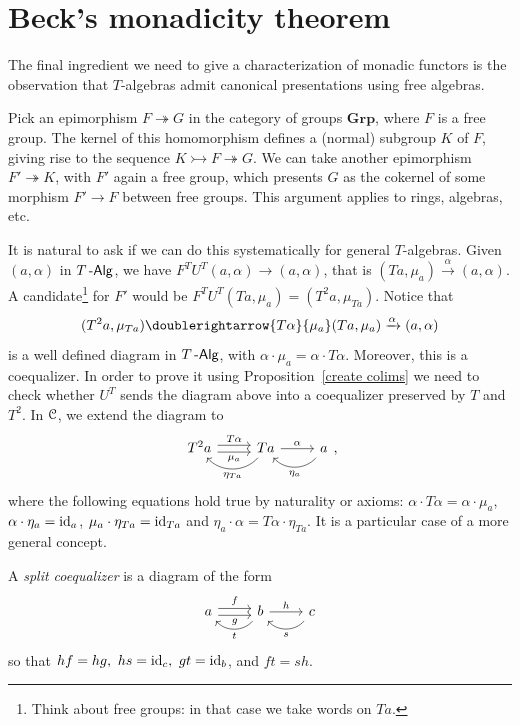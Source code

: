 \documentclass[a4paper,11pt,oneside,openany]{scrbook}
\begin{document}
\section{Beck’s monadicity theorem}

The final ingredient we need to give a characterization of monadic functors is the observation that $T$-algebras admit canonical presentations using free algebras.

\begin{exmp}
	Pick an epimorphism $F\twoheadrightarrow G$ in the category of groups $\mathbf{Grp}$, where $F$ is a free group. The kernel of this homomorphism defines a (normal) subgroup $K$ of $F$, giving rise to the sequence $K\rightarrowtail F\twoheadrightarrow G$. We can take another epimorphism $F'\twoheadrightarrow K$, with $F'$ again a free group, which presents $G$ as the cokernel of some morphism $F'\to F$ between free groups. This argument applies to rings, algebras, etc.
\end{exmp}

It is natural to ask if we can do this systematically for general $T$-algebras. Given $(a,\alpha)$ in $T\operatorname{-\mathsf{Alg}}$, we have $F^TU^T(a,\alpha)\to(a,\alpha)$, that is $(Ta,\mu_a)\xrightarrow{\alpha}(a,\alpha)$. A candidate\footnote{Think about free groups: in that case we take words on $Ta$.} for $F'$ would be $F^TU^T(Ta, \mu_a)=(T^2a, \mu_{Ta})$. Notice that
\[
	(T^2a,\mu_{Ta}) \doublerightarrow{T\alpha}{\mu_a}(Ta,\mu_a)\xrightarrow{\alpha}(a,\alpha)
\]
is a well defined diagram in $T\operatorname{-\mathsf{Alg}}$, with $\alpha\cdot\mu_a=\alpha\cdot
	T\alpha$. Moreover, this is a coequalizer. In order to prove it using
Proposition~\ref{create colims} we need to check whether $U^T$
sends the diagram above into a coequalizer preserved by $T$ and $T^2$. In $\operatorname{\mathcal{C}}$,
we extend the diagram to
\[
	\begin{tikzcd}
		T^2a\arrow[r, shift left, "T\alpha"] \arrow[r, shift right, "\mu_a"']
		&Ta  \arrow[r, "\alpha"] \arrow[l, bend left=49, swap, "\eta_{Ta}"'] & a \arrow[l, bend left=49, swap, "\eta_a"']
	\end{tikzcd}
	,\]
where the following equations hold true by naturality or axioms: $\alpha\cdot
	T\alpha=\alpha\cdot\mu_a$, $\alpha\cdot\eta_a=\operatorname{id}_a$,
$\mu_a\cdot\eta_{Ta}=\operatorname{id}_{Ta}$ and
$\eta_a\cdot\alpha=T\alpha\cdot\eta_{Ta}$. It is a particular case of a
more general concept.
\begin{defn}
	A \emph{split coequalizer} is a diagram of the form
	\vspace*{-2.4mm}
	\[
		\begin{tikzcd}[ampersand replacement=\&]
			a\arrow[r, shift left, "f"] \arrow[r, shift right, "g"']
			\& b \arrow[r, "h"] \arrow[l, bend left=49, "t"] \& c \arrow[l, bend left=49, "s"]
		\end{tikzcd}
	\]
	so that $hf=hg,\ hs=\id_c,\ gt=\id_b$, and $ft=sh$.
\end{defn}
\end{document}
